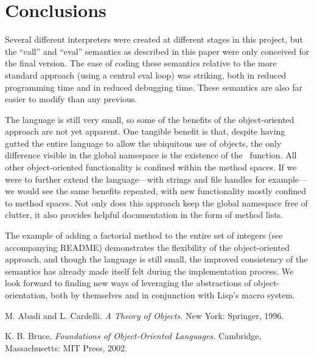 \documentclass[twocolumn]{article}
\begin{document}
\section*{Conclusions}
Several different interpreters were created at different stages in
this project, but the ``call'' and ``eval'' semantics as described in
this paper were only conceived for the final version. The ease of
coding these semantics relative to the more standard approach (using a
central eval loop) was striking, both in reduced programming time and
in reduced debugging time. These semantics are also far easier to
modify than any previous.

The language is still very small, so some of the benefits of the
object-oriented approach are not yet apparent. One tangible benefit is
that, despite having gutted the entire language to allow the
ubiquitous use of objects, the only difference visible in the global
namespace is the existence of the \msg\ function. All other
object-oriented functionality is confined within the method spaces. If
we were to further extend the language---with strings and file handles
for example---we would see the same benefits repeated, with new
functionality mostly confined to method spaces. Not only does this
approach keep the global namespace free of clutter, it also provides
helpful documentation in the form of method lists.

The example of adding a factorial method to the entire set of integers
(see accompanying README) demonstrates the flexibility of the
object-oriented approach, and though the language is still small, the
improved consistency of the semantics has already made itself felt
during the implementation process. We look forward to finding new ways
of leveraging the abstractions of object-orientation, both by
themselves and in conjunction with Lisp's macro system.

\begin{thebibliography}{9}
 M. Abadi and L. Cardelli. \textit{A Theory of Objects.} New
  York: Springer, 1996.

 K. B. Bruce. \textit{Foundations of Object-Oriented
    Languages.} Cambridge, Massachusetts: MIT Press, 2002.
\end{thebibliography}
\end{document}
